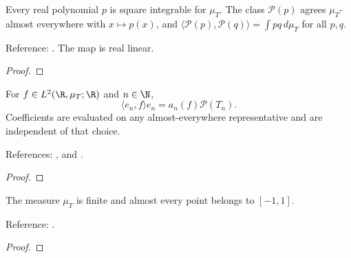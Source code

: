 \begin{supporting}

\begin{theorem}
\label{thm:polynomial-L2-basic}
\leanok
Every real polynomial $p$ is square integrable for $\mu_T$. The class
$\mathcal P(p)$ agrees $\mu_T$-almost everywhere with $x\mapsto p(x)$, and
$\langle\mathcal P(p),\mathcal P(q)\rangle=\int pq\,d\mu_T$ for all $p,q$.

Reference: \cite[Table 18.3.1]{dlmf}.
The map is real linear.
\end{theorem}
\begin{proof}
\leanok
\end{proof}

\begin{theorem}
\label{thm:T-coordinates}
\leanok

For $f\in L^2(\R,\mu_T;\R)$ and $n\in\N$,
\[\langle e_n,f\rangle e_n=a_n(f)\mathcal P(T_n).\]
Coefficients are evaluated on any almost-everywhere representative and are independent of that choice.

References: \cite[Chapter 3]{atap},
and \cite[Table 18.3.1]{dlmf}.
\end{theorem}
\begin{proof}
\leanok
\end{proof}

\begin{lemma}
\label{lem:T-finite}
\leanok

The measure $\mu_T$ is finite and almost every point belongs to $[-1,1]$.

Reference: \cite[Table 18.3.1]{dlmf}.
\end{lemma}
\begin{proof}
\leanok
\end{proof}

\begin{theorem}
\label{thm:polynomial-dense}
\leanok


\end{theorem}
\end{supporting}
